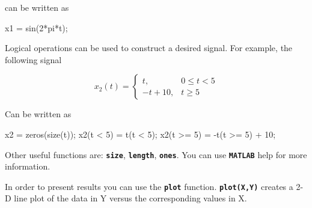 \documentclass{article}
\begin{document}
\begin{par}
\begin{flushleft}
can be written as
\end{flushleft}
\end{par}

\begin{matlabcode}
x1 = sin(2*pi*t);
\end{matlabcode}


\begin{par}
\begin{flushleft}
Logical operations can be used to construct a desired signal. For example, the following signal
\end{flushleft}
\end{par}

\begin{par}
$$x_2 (t)=\left\lbrace \begin{array}{cc}
t, & 0\le t<5\\
-t+10, & t\ge 5
\end{array}\right.$$
\end{par}

\begin{par}
\begin{flushleft}
Can be written as
\end{flushleft}
\end{par}

\begin{matlabcode}
x2 = zeros(size(t)); %
x2(t < 5) = t(t < 5); %
x2(t >= 5) = -t(t >= 5) + 10; %
\end{matlabcode}


\begin{par}
\begin{flushleft}
Other useful functions are: \texttt{\textbf{size}}, \texttt{\textbf{length}}, \texttt{\textbf{ones}}. You can use \texttt{\textbf{MATLAB}} help for more information.
\end{flushleft}
\end{par}


\begin{par}
\begin{flushleft}
In order to present results you can use the \texttt{\textbf{plot}} function. \texttt{\textbf{plot(X,Y)}} creates a 2-D line plot of the data in Y versus the corresponding values in X.
\end{flushleft}
\end{par}
\end{document}
